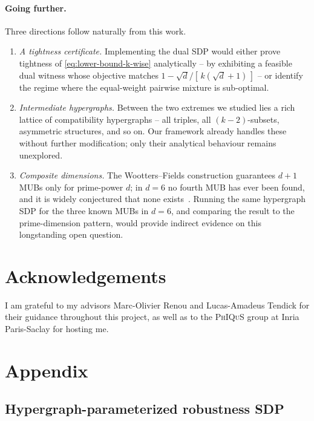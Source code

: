 \documentclass[oneside, a4paper, onecolumn, 11pt]{article}
\theoremstyle{definition}
\theoremstyle{plain}
\theoremstyle{remark}
\begin{document}
\paragraph{Going further.}
Three directions follow naturally from this work.
\begin{enumerate}
  \item[(i)] \emph{A tightness certificate.} Implementing the dual SDP
        would either prove tightness of \eqref{eq:lower-bound-k-wise}
        analytically -- by exhibiting a feasible dual witness whose
        objective matches $1 - \sqrt{d}/[\,k(\sqrt{d}+1)\,]$ -- or
        identify the regime where the equal-weight pairwise mixture is
        sub-optimal.
  \item[(ii)] \emph{Intermediate hypergraphs.} Between the two extremes
        we studied lies a rich lattice of compatibility hypergraphs --
        all triples, all $(k\!-\!2)$-subsets, asymmetric structures,
        and so on. Our framework already handles these without further
        modification; only their analytical behaviour remains
        unexplored.
  \item[(iii)] \emph{Composite dimensions.} The Wootters--Fields
        construction guarantees $d+1$ MUBs only for prime-power $d$;
        in $d = 6$ no fourth MUB has ever been found, and it is widely
        conjectured that none exists~\cite{Guhne2023}. Running the
        same hypergraph SDP for the three known MUBs in $d = 6$, and
        comparing the result to the prime-dimension pattern, would
        provide indirect evidence on this longstanding open question.
\end{enumerate}


\section*{Acknowledgements}
I am grateful to my advisors Marc-Olivier Renou and Lucas-Amadeus
Tendick for their guidance throughout this project, as well as to the
\textsc{PhIQuS} group at Inria Paris-Saclay for hosting me.

\newpage



\newpage
\appendix

\section{Appendix}
\label{sec:appendix}

\subsection{Hypergraph-parameterized robustness SDP}
\label{app:robustness-code}
\end{document}

